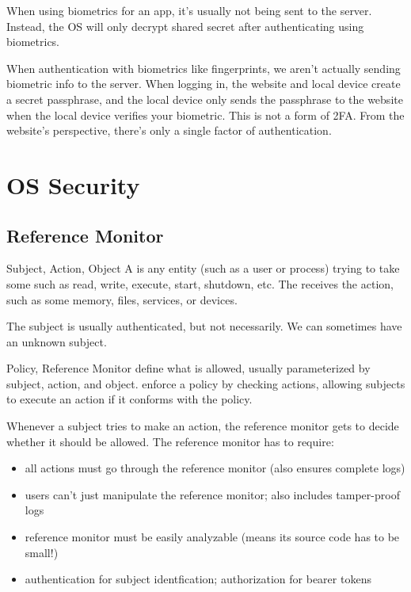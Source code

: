 \documentclass[code]{amznotes}
\begin{document}
When using biometrics for an app, it's usually not being sent to the server. Instead, the OS will only decrypt shared secret after authenticating using biometrics.

\begin{notebox}{}
    When authentication with biometrics like fingerprints, we aren't actually sending biometric info to the server. When logging in, the website and local device create a secret passphrase, and the local device only sends the passphrase to the website when the local device verifies your biometric. This is not a form of 2FA. From the website's perspective, there's only a single factor of authentication.
\end{notebox}

\chapter{OS Security}



\section{Reference Monitor}

\begin{dfnbox}{Subject, Action, Object}{}
    A  is any entity (such as a user or process) trying to take some  such as read, write, execute, start, shutdown, etc. The  receives the action, such as some memory, files, services, or devices.
\end{dfnbox}

The subject is usually authenticated, but not necessarily. We can sometimes have an unknown subject.

\begin{dfnbox}{Policy, Reference Monitor}{}
     define what is allowed, usually parameterized by subject, action, and object.  enforce a policy by checking actions, allowing subjects to execute an action if it conforms with the policy.
\end{dfnbox}

Whenever a subject tries to make an action, the reference monitor gets to decide whether it should be allowed. The reference monitor has to require:

\begin{itemize}
    \item {} all actions must go through the reference monitor (also ensures complete logs)
    \item {} users can't just manipulate the reference monitor; also includes tamper-proof logs
    \item {} reference monitor must be easily analyzable (means its source code has to be small!)
    \item {} authentication for subject identfication; authorization for bearer tokens
\end{itemize}
\end{document}
